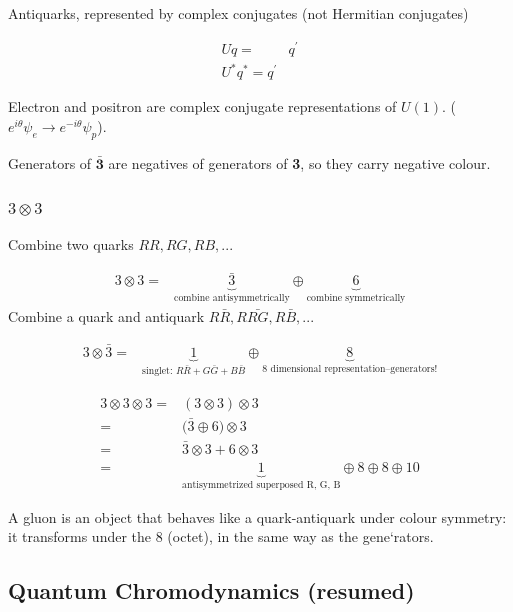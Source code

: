 \documentclass[]{article}
\begin{document}
Antiquarks, represented by complex conjugates (not Hermitian conjugates)

\begin{align*}
	U q =& q^\prime\\
	U^* q^* = q^\prime& 
\end{align*}

Electron and positron are complex conjugate representations of $U(1)$. ($e^{i\theta}\psi_e \rightarrow e^{-i\theta}\psi_p$).

Generators of $\bm{\bar{3}}$ are negatives of generators of {\bfseries 3}, so they carry negative colour.

\subsubsection{$3 \otimes 3$}\label{sec:3:3:8}

Combine two quarks ${RR, RG, RB,...}$

\begin{align*}
	3 \otimes 3 =& \underbrace{\bar{3}}_\text{combine antisymmetrically} \oplus \underbrace{6}_\text{combine symmetrically}
\end{align*}
Combine a quark and antiquark ${R\bar{R}, R\bar{RG}, R\bar{B},...}$

\begin{align*}
	3 \otimes \bar{3} =& \underbrace{1}_\text{singlet: $R\bar{R}+G\bar{G}+B\bar{B}$} \oplus \underbrace{8}_\text{8 dimensional representation--generators!}
\end{align*}

\begin{align*}
	3 \otimes 3 \otimes 3 =& (3 \otimes 3) \otimes 3\\
	=& \big(\bar{3} \oplus 6 \big) \otimes 3\\
	=& \bar{3}   \otimes 3 + 6 \otimes 3\\
	=& \underbrace{1}_\text{antisymmetrized superposed R, G, B} \oplus 8 \oplus 8 \oplus 10
\end{align*}

A gluon is an object that behaves like a quark-antiquark under colour symmetry: it transforms under the 8 (octet), in the same way as the gene`rators.

\subsection{Quantum Chromodynamics (resumed)}
\end{document}
